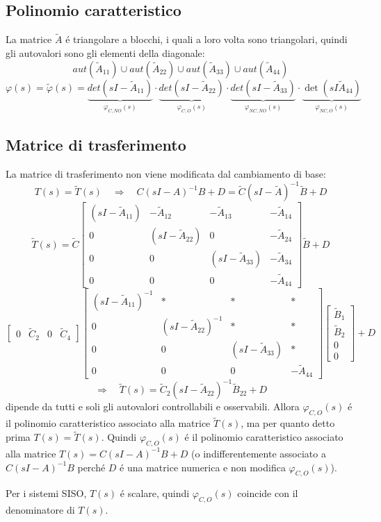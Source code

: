 \documentclass[../main.tex]{subfiles}
\begin{document}
	\subsection{Polinomio caratteristico}
		La matrice $ \tilde A $ \'e triangolare a blocchi, i quali a loro volta sono triangolari, quindi gli autovalori sono gli elementi della diagonale:
		\[
			aut(\tilde A_{11}) \cup aut(\tilde A_{22}) \cup aut(\tilde A_{33}) \cup aut(\tilde A_{44})
		\]
		\[
			\varphi(s) = \tilde \varphi(s) = \underbrace{det(sI-\tilde A_{11})}_{\varphi_{C,NO}(s)} \cdot \underbrace{det(sI-\tilde A_{22})}_{\varphi_{C,O}(s)} \cdot \underbrace{det(sI-\tilde A_{33})}_{\varphi_{NC,NO}(s)} \cdot \underbrace{\det(sI \tilde A_{44})}_{\varphi_{NC,O}(s)}
		\]
		
	\subsection{Matrice di trasferimento}
		La matrice di trasferimento non viene modificata dal cambiamento di base:
		\[
			T(s) = \tilde T(s) \quad\Rightarrow\quad C(sI-A)^{-1}B+D = \tilde C(sI- \tilde A)^{-1} \tilde B + D
		\]
		\[
			\tilde T(s) = \tilde C
			\begin{bmatrix}
				(sI-\tilde A_{11}) & -\tilde A_{12} & -\tilde A_{13} & -\tilde A_{14}\\
				0 & (sI-\tilde A_{22}) & 0 & -\tilde A_{24}\\
				0 & 0 & (sI-\tilde A_{33}) & -\tilde A_{34}\\
				0 & 0 & 0 & -\tilde A_{44}
			\end{bmatrix} \tilde B + D
		\]
		\[
			\begin{bmatrix}
				0 & \tilde C_2 & 0 & \tilde C_4
			\end{bmatrix}
			\begin{bmatrix}
				(sI-\tilde A_{11})^{-1} & * & * & *\\
				0 & (sI-\tilde A_{22})^{-1} & * & *\\
				0 & 0 & (sI-\tilde A_{33}) & *\\
				0 & 0 & 0 & -\tilde A_{44}
			\end{bmatrix}
			\begin{bmatrix}
				\tilde B_1\\
				\tilde B_2\\
				0\\
				0
			\end{bmatrix} + D
		\]
		\[
			\Rightarrow\quad \tilde T(s) = \tilde C_2 (sI- \tilde A_{22})^{-1} \tilde B_{22} + D
		\]
		dipende da tutti e soli gli autovalori controllabili e osservabili. Allora $ \varphi_{C,O}(s) $ \'e il polinomio caratteristico associato alla matrice $ \tilde T(s) $, ma per quanto detto prima $ T(s) = \tilde T(s) $. Quindi $ \varphi_{C,O}(s) $ \'e il polinomio caratteristico associato alla matrice $ T(s) = C(sI-A)^{-1}B+D $ (o indifferentemente associato a $ C(sI-A)^{-1}B $ perch\'e $ D $ \'e una matrice numerica e non modifica $ \varphi_{C,O}(s) $).
		
		Per i sistemi SISO, $ T(s) $ \'e scalare, quindi $ \varphi_{C,O}(s) $ coincide con il denominatore di $ T(s) $.
\end{document}
